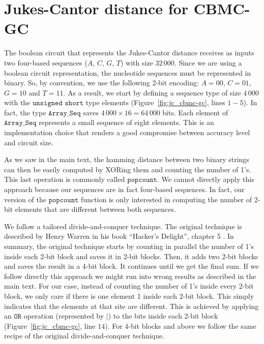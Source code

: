 
\appendix

\chapter{Jukes-Cantor distance for CBMC-GC}\label{appendix:appendixA}

%

The boolean circuit that represents the Jukes-Cantor distance receives as inputs two four-based sequences ($A$, $C$, $G$, $T$) with size $32\, 000$. Since we are using a boolean circuit representation, the nucleotide sequences must be represented in binary. So, by convention, we use the following 2-bit encoding: $A = 00$, $C = 01$, $G = 10$ and $T = 11$. As a result, we start by defining a sequence type of size $4\, 000$ with the $\texttt{unsigned short}$ type elements (Figure~\ref{fig:jc_cbmc-gc}, lines $1-5$). In fact, the type $\texttt{Array\_Seq}$ saves $4\, 000 \times 16 = 64\, 000$ bits. Each element of $\texttt{Array\_Seq}$ represents a small sequence of eight elements. This is an implementation choice that renders a good compromise between accuracy level and circuit size.

As we saw in the main text, the hamming distance between two binary strings can then be easily computed by XORing them and counting the number of 1’s. This last operation is commonly called $\texttt{popcount}$. We cannot directly apply this approach because our sequences are in fact four-based sequences. In fact, our version of the $\texttt{popcount}$ function is only interested in computing the number of 2-bit elements that are different between both sequences.

We follow a tailored divide-and-conquer technique. The original technique is described by Henry Warren in his book “Hacker’s Delight”, chapter 5 \citep{W12}. In summary, the original technique starts by counting in parallel the number of 1’s inside each 2-bit block and saves it in 2-bit blocks. Then, it adds two 2-bit blocks and saves the result in a 4-bit block. It continues until we get the final sum. If we follow directly this approach we might run into wrong results as described in the main text. For our case, instead of counting the number of 1’s inside every 2-bit block, we only care if there is one element 1 inside each 2-bit block. This simply indicates that the elements at that site are different. This is achieved by applying an $\texttt{OR}$ operation (represented by $\texttt{|}$) to the bits inside each 2-bit block (Figure~\ref{fig:jc_cbmc-gc}, line $14$). For 4-bit blocks and above we follow the same recipe of the original divide-and-conquer technique. 

